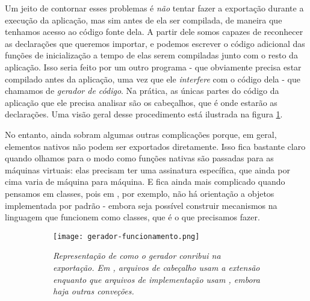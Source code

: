     Um jeito de contornar esses problemas é \emph{não} tentar fazer a exportação
    durante a execução da aplicação, mas sim antes de ela ser compilada, de
    maneira que tenhamos acesso ao código fonte dela. A partir dele somos
    capazes de reconhecer as declarações que queremos importar, e podemos
    escrever o código adicional das funções de inicialização a tempo
    de elas serem compiladas junto com o resto da aplicação. Isso seria feito
    por um outro programa - que obviamente precisa estar compilado antes da
    aplicação, uma vez que ele \emph{interfere} com o código dela - que chamamos
    de \emph{gerador de código}. Na prática, as únicas partes do código da
    aplicação que ele precisa analisar são os cabeçalhos, que é onde estarão as
    declarações. Uma visão geral desse procedimento está ilustrada na figura
    \ref{fig:gerador-funcionamento}.

    No entanto, ainda sobram algumas outras complicações porque, em geral,
    elementos nativos não podem ser exportados diretamente. Isso fica bastante
    claro quando olhamos para o modo como funções nativas são passadas para as
    máquinas virtuais: elas precisam ter uma assinatura específica, que ainda
    por cima varia de máquina para máquina. E fica ainda mais complicado quando
    pensamos em classes, pois em , por exemplo, não há orientação a
    objetos implementada por padrão - embora seja possível construir mecanismos
    na linguagem que funcionem como classes, que é o que precisamos fazer.

    \begin{figure}[ht]
      \centering
      \caption{}
      \begin{subfigure}{.8\textwidth}
        \begin{center}
          \texttt{[image: gerador-funcionamento.png]}
          \vspace{1em}

          \textit{
            Representação de como o gerador conribui na exportação.
            Em \CXX{}, arquivos de cabeçalho usam a extensão  enquanto
            que arquivos de implementação usam , embora haja outras
            conveções.
          }
        \end{center}
      \end{subfigure}
      \label{fig:gerador-funcionamento}
    \end{figure}

